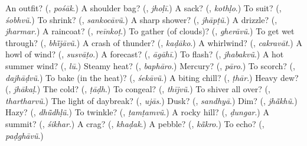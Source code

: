 \begin{tcolorbox}[breakable,colback=teal!4,colframe=teal!35!black,title={Before you move on}]
An outfit? (\textbf{}, \emph{pośāk}.) A shoulder bag? (\textbf{}, \emph{jhoḷī}.) A sack? (\textbf{}, \emph{kothḷo}.) To suit? (\textbf{}, \emph{śobhvũ}.) To shrink? (\textbf{}, \emph{sankocāvũ}.) A sharp shower? (\textbf{}, \emph{jhāpṭũ}.) A drizzle? (\textbf{}, \emph{jharmar}.) A raincoat? (\textbf{}, \emph{reīnkoṭ}.) To gather (of clouds)? (\textbf{}, \emph{gherāvũ}.) To get wet through? (\textbf{}, \emph{bhī̃jāvũ}.) A crash of thunder? (\textbf{}, \emph{kaḍāko}.) A whirlwind? (\textbf{}, \emph{cakravāt}.) A howl of wind? (\textbf{}, \emph{susvāṭo}.) A forecast? (\textbf{}, \emph{āgāhī}.) To flash? (\textbf{}, \emph{jhabakvũ}.) A hot summer wind? (\textbf{}, \emph{lū}.) Steamy heat? (\textbf{}, \emph{baphāro}.) Mercury? (\textbf{}, \emph{pāro}.) To scorch? (\textbf{}, \emph{dajhāḍvũ}.) To bake (in the heat)? (\textbf{}, \emph{śekāvũ}.) A biting chill? (\textbf{}, \emph{ṭhār}.) Heavy dew? (\textbf{}, \emph{jhākaḷ}.) The cold? (\textbf{}, \emph{ṭāḍh}.) To congeal? (\textbf{}, \emph{thījvũ}.) To shiver all over? (\textbf{}, \emph{thartharvũ}.) The light of daybreak? (\textbf{}, \emph{ujās}.) Dusk? (\textbf{}, \emph{sandhyā}.) Dim? (\textbf{}, \emph{jhā̃khũ}.) Hazy? (\textbf{}, \emph{dhū̃dhḷũ}.) To twinkle? (\textbf{}, \emph{ṭamṭamvũ}.) A rocky hill? (\textbf{}, \emph{ḍungar}.) A summit? (\textbf{}, \emph{śikhar}.) A crag? (\textbf{}, \emph{khaḍak}.) A pebble? (\textbf{}, \emph{kā̃kro}.) To echo? (\textbf{}, \emph{paḍghāvũ}.)
\end{tcolorbox}
